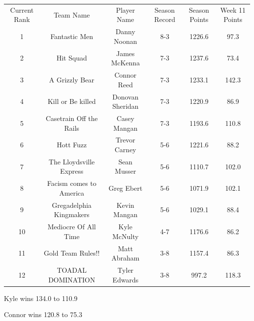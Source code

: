 \documentclass[11pt,letterpaper]{article}
\begin{document}
\newpage
{}
\vspace{-25pt}
\begin{table} [h]
\footnotesize
\begin{center}
\begin{tabular} { c c c c c c }
\\[3mm] Current Rank & Team Name & Player Name & Season Record &  Season Points & Week 11 Points
\\[3mm] 1 & Fantastic Men & Danny Noonan & 8-3 & 1226.6 & 97.3
\\ 2 & Hit Squad & James McKenna & 7-3 & 1237.6 & 73.4
\\ 3 & A Grizzly Bear & Connor Reed & 7-3 & 1233.1 & 142.3
\\ 4 & Kill or Be killed & Donovan Sheridan & 7-3 & 1220.9 & 86.9
\\ 5 & Casetrain Off the Rails & Casey Mangan & 7-3 & 1193.6 & 110.8
\\ 6 & Hott Fuzz & Trevor Carney & 5-6 & 1221.6 & 88.2
\\ 7 & The Lloydsville Express & Sean Musser & 5-6 & 1110.7 & 102.0
\\ 8 & Facism comes to America & Greg Ebert & 5-6 & 1071.9 & 102.1
\\ 9 & Gregadelphia Kingmakers & Kevin Mangan & 5-6 & 1029.1 & 88.4
\\ 10 & Mediocre Of All Time & Kyle McNulty & 4-7 & 1176.6 & 86.2
\\ 11 & Gold Team Rules!! & Matt Abraham & 3-8 & 1157.4 & 86.3
\\ 12 & TOADAL DOMINATION & Tyler Edwards & 3-8 & 997.2 & 118.3
\end{tabular}
\end{center}
\end{table}



\newpage
{}



\par\noindent Kyle wins 134.0 to 110.9
\bigskip
\par\noindent



{}
\par\noindent Connor wins 120.8 to 75.3
\bigskip
\par\noindent
\end{document}
